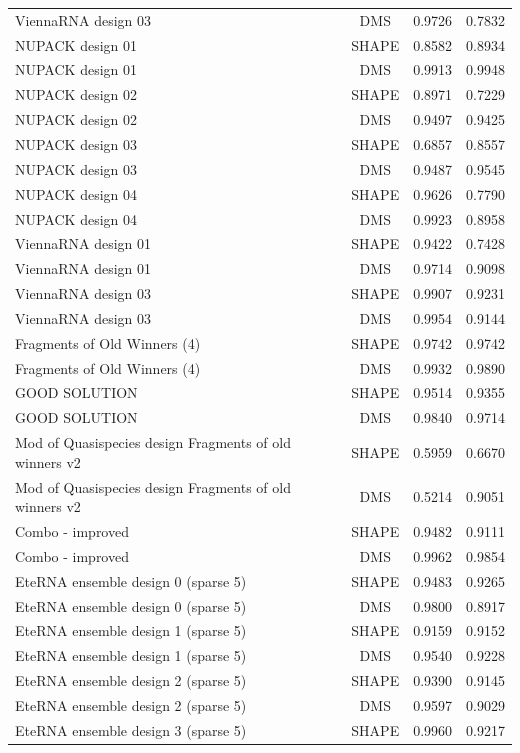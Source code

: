 \documentclass[letter]{bioinfo}
\begin{document}
\begin{center}
\begin{longtable}{lccc}
ViennaRNA design 03	&	DMS	&	0.9726 	&	0.7832 	\\
NUPACK design 01	&	SHAPE	&	0.8582 	&	0.8934 	\\
NUPACK design 01	&	DMS	&	0.9913 	&	0.9948 	\\
NUPACK design 02	&	SHAPE	&	0.8971 	&	0.7229 	\\
NUPACK design 02	&	DMS	&	0.9497 	&	0.9425 	\\
NUPACK design 03	&	SHAPE	&	0.6857 	&	0.8557 	\\
NUPACK design 03	&	DMS	&	0.9487 	&	0.9545 	\\
NUPACK design 04	&	SHAPE	&	0.9626 	&	0.7790 	\\
NUPACK design 04	&	DMS	&	0.9923 	&	0.8958 	\\
ViennaRNA design 01	&	SHAPE	&	0.9422 	&	0.7428 	\\
ViennaRNA design 01	&	DMS	&	0.9714 	&	0.9098 	\\
ViennaRNA design 03	&	SHAPE	&	0.9907 	&	0.9231 	\\
ViennaRNA design 03	&	DMS	&	0.9954 	&	0.9144 	\\
Fragments of Old Winners (4)	&	SHAPE	&	0.9742 	&	0.9742 	\\
Fragments of Old Winners (4)	&	DMS	&	0.9932 	&	0.9890 	\\
GOOD SOLUTION	&	SHAPE	&	0.9514 	&	0.9355 	\\
GOOD SOLUTION	&	DMS	&	0.9840 	&	0.9714 	\\
Mod of Quasispecies design Fragments of old winners v2	&	SHAPE	&	0.5959 	&	0.6670 	\\
Mod of Quasispecies design Fragments of old winners v2	&	DMS	&	0.5214 	&	0.9051 	\\
Combo - improved	&	SHAPE	&	0.9482 	&	0.9111 	\\
Combo - improved	&	DMS	&	0.9962 	&	0.9854 	\\
EteRNA ensemble design 0 (sparse 5)	&	SHAPE	&	0.9483 	&	0.9265 	\\
EteRNA ensemble design 0 (sparse 5)	&	DMS	&	0.9800 	&	0.8917 	\\
EteRNA ensemble design 1 (sparse 5)	&	SHAPE	&	0.9159 	&	0.9152 	\\
EteRNA ensemble design 1 (sparse 5)	&	DMS	&	0.9540 	&	0.9228 	\\
EteRNA ensemble design 2 (sparse 5)	&	SHAPE	&	0.9390 	&	0.9145 	\\
EteRNA ensemble design 2 (sparse 5)	&	DMS	&	0.9597 	&	0.9029 	\\
EteRNA ensemble design 3 (sparse 5)	&	SHAPE	&	0.9960 	&	0.9217 	\\

\end{longtable}
\end{center}
\end{document}
